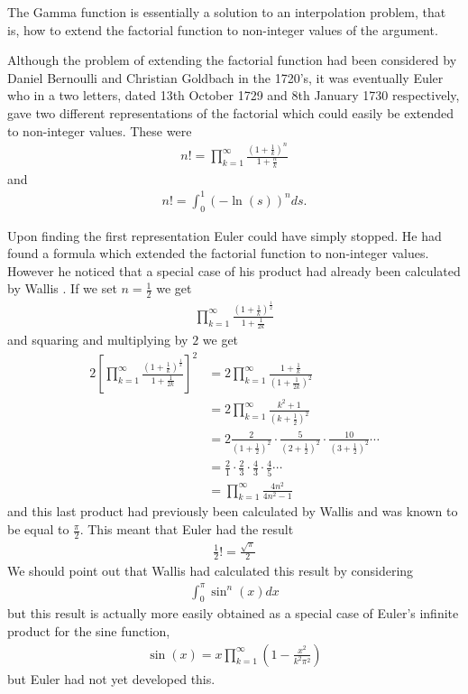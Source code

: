 The Gamma function is essentially a solution to an interpolation problem, that is, how to extend the factorial function to non-integer values of the argument. 



Although the problem of extending the factorial function had been considered by Daniel Bernoulli and Christian Goldbach in the 1720’s, it was eventually Euler who in a two letters, dated 13th October 1729 and 8th January 1730 respectively, gave two different representations of the factorial which could easily be extended to non-integer values. These were
\begin{align}
    \label{eq:euler_prod}
    n! = \prod_{k=1}^\infty \frac{\left(1+\frac{1}{k}\right)^n}{1 + \frac{n}{k}}
\end{align}
and
\begin{align}
    \label{eq:euler_log}
    n! = \int_0^1 (-\ln(s))^n ds.
\end{align}

Upon finding the first representation Euler could have simply stopped. He had found a formula which extended the factorial function to non-integer values. However he noticed that a special case of his product had already been calculated by Wallis \cite{Davis1959}. If we set $ n = \frac{1}{2} $ we get
\begin{align}
    \prod_{k=1}^\infty \frac{(1 + \frac{1}{k})^\frac{1}{2}}{1 + \frac{1}{2k}}
\end{align}
and squaring and multiplying by $ 2 $ we get
\begin{align}
    2 \left[ \prod_{k=1}^\infty \frac{(1 + \frac{1}{k})^\frac{1}{2}}{1 + \frac{1}{2k}}\right]^2 &= 2\prod_{k=1}^\infty \frac{1+\frac{1}{k}}{(1+\frac{1}{2k})^2} \\
    &= 2 \prod^\infty_{k=1} \frac{k^2+1}{(k + \frac{1}{2})^2} \\
    &= 2 \frac{2}{(1+\frac{1}{2})^2} \cdot \frac{5}{(2 + \frac{1}{2})^2} \cdot \frac{10}{(3+\frac{1}{2})^2}\cdots \\
    &= \frac{2}{1}\cdot\frac{2}{3}\cdot\frac{4}{3}\cdot\frac{4}{5}\cdots \\
    &= \prod_{k=1}^{\infty} \frac{4n^2}{4n^2-1}
\end{align}
and this last product had previously been calculated by Wallis and was known to be equal to $ \frac{\pi}{2} $. This meant that Euler had the result 
\begin{align}
    \frac{1}{2} ! = \frac{\sqrt{\pi}}{2}
\end{align}
We should point out that Wallis had calculated this result by considering 
\begin{align}
    \int_0^\pi \sin^n(x) dx
\end{align}
but this result is actually more easily obtained as a special case of Euler's infinite product for the sine function,
\begin{align}
    \sin(x) = x\prod_{k=1}^\infty \left( 1 - \frac{x^2}{k^2\pi^2} \right)
\end{align}
but Euler had not yet developed this.

